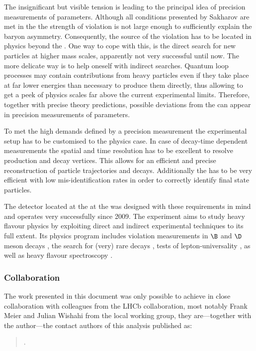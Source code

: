 The insignificant but visible tension is leading to the principal idea of
precision measurements of \CKM parameters. Although all conditions presented by
Sakharov are met in the \SM the strength of \CP violation is not large enough to
sufficiently explain the baryon asymmetry. Consequently, the source of the \CP
violation has to be located in physics beyond the \SM. One way to cope with
this, is the direct search for new particles at higher mass scales, apparently
not very successful until now. The more delicate way is to help oneself with
indirect searches. Quantum loop processes may contain contributions from heavy
particles even if they take place at far lower energies than necessary to
produce them directly, thus allowing to get a peek of physics scales far above
the current experimental limits. Therefore, together with precise theory
predictions, possible deviations from the \SM can appear in precision
measurements of \SM parameters.

To met the high demands defined by a precision measurement the experimental
setup has to be customised to the physics case. In case of decay-time dependent
measurements the spatial and time resolution has to be excellent to resolve
production and decay vertices. This allows for an efficient and precise
reconstruction of particle trajectories and decays. Additionally the \PID has to
be very efficient with low mis-identification rates in order to correctly
identify final state particles.

The \LHCb detector located at the \LHC at the \CERN was designed with these
requirements in mind and operates very successfully since 2009. The \LHCb
experiment aims to study heavy flavour physics by exploiting direct and indirect
experimental techniques to its full extent. Its physics program includes \CP
violation measurements in $\B$ and $\D$ meson decays
\cite{Aaij:2015tza,Aaij:2015yda,Aaij:2014uva,Aaij:2014fba,Aaij:2014dka,Aaij:2014zsa,Aaij:2014kxa}, 
the search for (very) rare decays \cite{CMS:2014xfa}, tests of
lepton-universality \cite{Aaij:2014ora,Aaij:2015yra}, as well as heavy flavour
spectroscopy \cite{Aaij:2014yka,Aaij:2015tga}.

\subsubsection*{Collaboration}
The work presented in this document was only possible to achieve in close
collaboration with colleagues from the \acs{LHCb} collaboration, most notably
Frank Meier and Julian Wishahi from the local working group, they are---together
with the author---the contact authors of this analysis published as:
%
\begin{quotation}
  .
\end{quotation}

